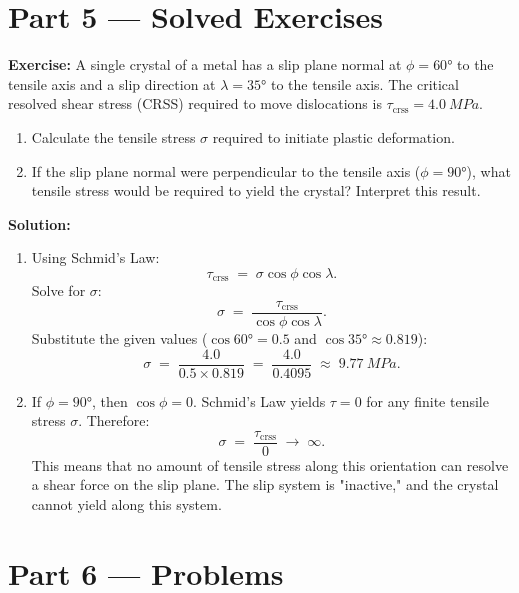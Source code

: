 \documentclass[12pt, a4paper]{book}
\begin{document}
\newpage

\section{Part 5 --- Solved Exercises}

\begin{problembox}
\textbf{Exercise:} A single crystal of a metal has a slip plane normal at $\phi = \ang{60}$ to the tensile axis and a slip direction at $\lambda = \ang{35}$ to the tensile axis. The critical resolved shear stress (CRSS) required to move dislocations is $\tau_{\text{crss}} = \SI{4.0}{MPa}$.
\begin{enumerate}
  \item Calculate the tensile stress $\sigma$ required to initiate plastic deformation.
  \item If the slip plane normal were perpendicular to the tensile axis ($\phi = \ang{90}$), what tensile stress would be required to yield the crystal? Interpret this result.
\end{enumerate}

\textbf{Solution:}
\begin{enumerate}
  \item Using Schmid's Law:
        \[
          \tau_{\text{crss}} \;=\; \sigma \cos\phi \cos\lambda.
        \]
        Solve for $\sigma$:
        \[
          \sigma \;=\; \frac{\tau_{\text{crss}}}{\cos\phi \cos\lambda}.
        \]
        Substitute the given values ($\cos\ang{60} = 0.5$ and $\cos\ang{35} \approx 0.819$):
        \[
          \sigma \;=\; \frac{4.0}{0.5 \times 0.819} \;=\; \frac{4.0}{0.4095} \;\approx\; \SI{9.77}{MPa}.
        \]
  \item If $\phi = \ang{90}$, then $\cos\phi = 0$. Schmid's Law yields $\tau = 0$ for any finite tensile stress $\sigma$. Therefore:
        \[
          \sigma \;=\; \frac{\tau_{\text{crss}}}{0} \;\to\; \infty.
        \]
        This means that no amount of tensile stress along this orientation can resolve a shear force on the slip plane. The slip system is "inactive," and the crystal cannot yield along this system.
\end{enumerate}
\end{problembox}

\newpage

\section{Part 6 --- Problems}
\end{document}
